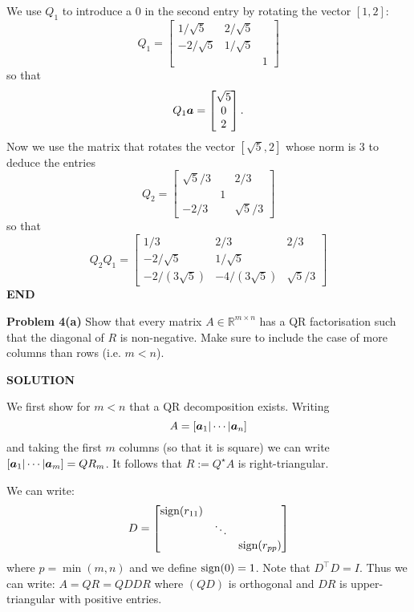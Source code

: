 \documentclass[12pt,a4paper]{article}
\def\bbR{ {\mathbb R} }
\def\a{ {\vc a} }
\begin{document}
We use $Q_1$ to introduce a 0 in the second entry by rotating the vector $[1,2]$:
\[
Q_1 =  \begin{bmatrix} 1/\sqrt{5}  & 2/\sqrt{5} \\ -2/\sqrt{5} & 1/\sqrt{5} \\ && 1 \end{bmatrix}
\]
so that
\[
Q_1 \ensuremath{\bm{\a}} = \begin{bmatrix} \sqrt{5} \\ 0 \\ 2 \end{bmatrix}.
\]
Now we use the matrix that rotates the vector $[\sqrt{5},2]$ whose norm is $3$ to deduce the entries
\[
Q_2 = \begin{bmatrix} \sqrt{5}/3 & & 2/3  \\ & 1 \\
-2/3  & & \sqrt{5}/3  \end{bmatrix}
\]
so that
\[
Q_2 Q_1 = \begin{bmatrix} 1/3 & 2/3 & 2/3 \\ 
 -2/\sqrt{5} & 1/\sqrt{5} & \\ 
 -2/(3\sqrt{5}) & -4/(3\sqrt{5}) & \sqrt{5}/3
 \end{bmatrix}
\]
\textbf{END}

\textbf{Problem 4(a)} Show that every matrix $A \ensuremath{\in} \ensuremath{\bbR}^{m \ensuremath{\times} n}$ has a  QR factorisation such that the diagonal of $R$ is non-negative. Make sure to include the case of more columns than rows (i.e. $m < n$). 

\textbf{SOLUTION}

We first show for $m < n$ that a QR decomposition exists. Writing
\[
A = [\ensuremath{\bm{\a}}_1 | \ensuremath{\cdots} | \ensuremath{\bm{\a}}_n]
\]
and taking the first $m$ columns (so that it is square) we can write $[\ensuremath{\bm{\a}}_1 | \ensuremath{\cdots} | \ensuremath{\bm{\a}}_m] = Q R_m$. It follows that $R := Q^\ensuremath{\star} A$ is right-triangular.

We can write:
\[
D = \begin{bmatrix} \hbox{sign}(r_{11}) \\ & \ensuremath{\ddots}  \\ && \hbox{sign}(r_{pp}) \end{bmatrix}
\]
where $p = \min(m,n)$ and we define $\hbox{sign}(0) = 1$. Note that $D^\ensuremath{\top} D = I$. Thus we can write: $A = Q R = Q D D R$ where $(QD)$ is orthogonal and $DR$ is upper-triangular with positive entries.
\end{document}
